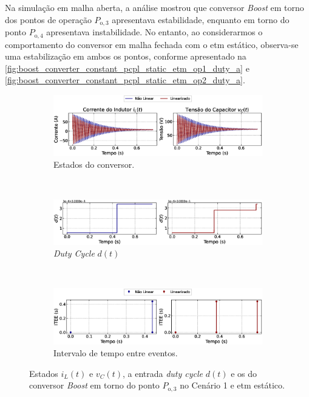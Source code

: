 Na simulação em malha aberta, a análise mostrou que conversor \textit{Boost }em torno dos pontos de operação $P_{\mathrm{o}, 3}$ apresentava estabilidade, enquanto em torno do ponto $P_{\mathrm{o}, 4}$ apresentava instabilidade. No entanto, ao considerarmos o comportamento do conversor em malha fechada com o \acrshort{etm} estático, observa-se uma estabilização em ambos os pontos, conforme apresentado na \autoref{fig:boost_converter_constant_pcpl_static_etm_op1_duty_a} e \autoref{fig:boost_converter_constant_pcpl_static_etm_op2_duty_a}. 

\begin{figure}[H]
  \centering
  \captionsetup{justification=centering}
  \begin{subfigure}{1.\textwidth}
    \centering
    \includegraphics[width=1.\textwidth]{figuras/static-etm/boost/sim1/op1/result.eps}
    \caption{Estados do conversor.}
    \label{fig:boost_converter_constant_pcpl_static_etm_op1_duty_a}
  \end{subfigure}
  \\[6pt]
  \begin{subfigure}{1.\textwidth}
    \centering
    \includegraphics[width=1.\textwidth]{figuras/static-etm/boost/sim1/op1/duty-cycle.eps}
    \caption{\textit{Duty Cycle} $d(t)$}
    \label{fig:boost_converter_constant_pcpl_static_etm_op1_duty_b}
  \end{subfigure}
  \\[6pt]
  \begin{subfigure}{1.\textwidth}
    \centering
    \includegraphics[width=1.\textwidth]{figuras/static-etm/boost/sim1/op1/inter-event-times.eps}
    \caption{Intervalo de tempo entre eventos.}
    \label{fig:boost_converter_constant_pcpl_static_etm_op1_duty_c}
  \end{subfigure}
  \caption{Estados $i_L(t)$ e $v_C(t)$, a entrada \textit{duty cycle} $d(t)$ e os  do conversor \textit{Boost }em torno do ponto $P_{\mathrm{o}, 3}$ no Cenário 1 e \acrshort{etm} estático.}
\end{figure}

